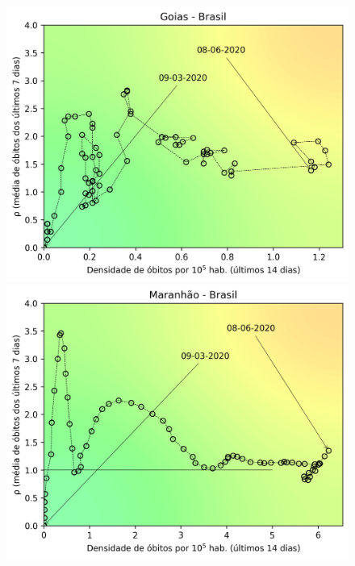 \documentclass[]{article}
\begin{document}
\begin{figure}[!h]
	\centering
	\begin{minipage}[t]{4cm}
		\centering
		\includegraphics[scale=0.5]{../GO.png}
	\end{minipage}
	\hspace{5cm}
	\begin{minipage}[t]{4cm}
		\centering
		\includegraphics[scale=0.5]{../MA.png}
		\vspace{0.2cm}
	\end{minipage}
	

\end{figure}
\end{document}
